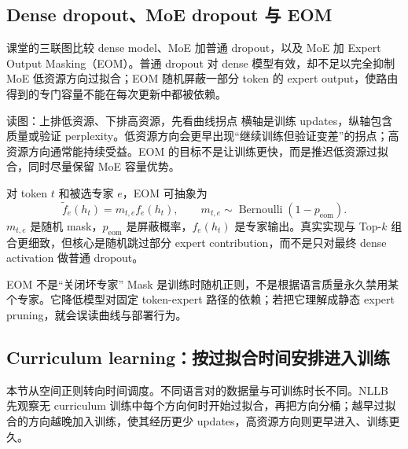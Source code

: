 \subsection{Dense dropout、MoE dropout 与 EOM}

课堂的三联图比较 dense model、MoE 加普通 dropout，以及 MoE 加 Expert Output Masking（EOM）。普通 dropout 对 dense 模型有效，却不足以完全抑制 MoE 低资源方向过拟合；EOM 随机屏蔽一部分 token 的 expert output，使路由得到的专门容量不能在每次更新中都被依赖。


\begin{knowledgebox}{读图：上排低资源、下排高资源，先看曲线拐点}
横轴是训练 updates，纵轴包含质量或验证 perplexity。低资源方向会更早出现“继续训练但验证变差”的拐点；高资源方向通常能持续受益。EOM 的目标不是让训练更快，而是推迟低资源过拟合，同时尽量保留 MoE 容量优势。
\end{knowledgebox}

对 token $t$ 和被选专家 $e$，EOM 可抽象为
\[
\widetilde{f}_e(h_t)=m_{t,e}f_e(h_t),\qquad
m_{t,e}\sim\operatorname{Bernoulli}(1-p_{\text{eom}}).
\]
$m_{t,e}$ 是随机 mask，$p_{\text{eom}}$ 是屏蔽概率，$f_e(h_t)$ 是专家输出。真实实现与 Top-$k$ 组合更细致，但核心是随机跳过部分 expert contribution，而不是只对最终 dense activation 做普通 dropout。

\begin{warningbox}{EOM 不是“关闭坏专家”}
Mask 是训练时随机正则，不是根据语言质量永久禁用某个专家。它降低模型对固定 token-expert 路径的依赖；若把它理解成静态 expert pruning，就会误读曲线与部署行为。
\end{warningbox}


\subsection{Curriculum learning：按过拟合时间安排进入训练}

本节从空间正则转向时间调度。不同语言对的数据量与可训练时长不同。NLLB 先观察无 curriculum 训练中每个方向何时开始过拟合，再把方向分桶；越早过拟合的方向越晚加入训练，使其经历更少 updates，高资源方向则更早进入、训练更久。


